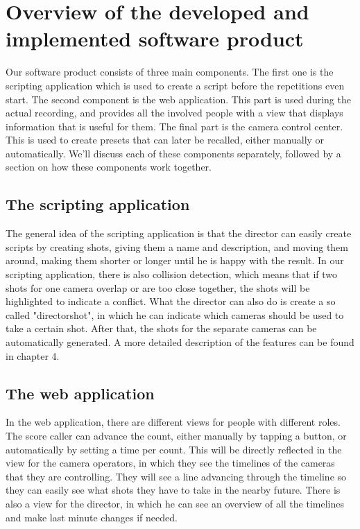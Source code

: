 \section{Overview of the developed and implemented software product}

Our software product consists of three main components. The first one is the scripting application which is used to create a script before the repetitions even start. The second component is the web application. This part is used during the actual recording, and provides all the involved people with a view that displays information that is useful for them. The final part is the camera control center. This is used to create presets that can later be recalled, either manually or automatically. We'll discuss each of these components separately, followed by a section on how these components work together.

\subsection{The scripting application}
The general idea of the scripting application is that the director can easily create scripts by creating shots, giving them a name and description, and moving them around, making them shorter or longer until he is happy with the result. In our scripting application, there is also collision detection, which means that if two shots for one camera overlap or are too close together, the shots will be highlighted to indicate a conflict. What the director can also do is create a so called "directorshot", in which he can indicate which cameras should be used to take a certain shot. After that, the shots for the separate cameras can be automatically generated. A more detailed description of the features can be found in chapter 4.

\subsection{The web application}
In the web application, there are different views for people with different roles. The score caller can advance the count, either manually by tapping a button, or automatically by setting a time per count. This will be directly reflected in the view for the camera operators, in which they see the timelines of the cameras that they are controlling. They will see a line advancing through the timeline so they can easily see what shots they have to take in the nearby future. There is also a view for the director, in which he can see an overview of all the timelines and make last minute changes if needed. 

